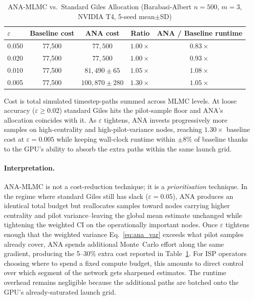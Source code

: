 \documentclass[pdflatex,sn-mathphys-num]{sn-jnl}
\theoremstyle{thmstyleone}%
\theoremstyle{thmstyletwo}%
\theoremstyle{thmstylethree}%
\begin{document}
\begin{table}[!t]
\caption{ANA-MLMC vs.\ Standard Giles Allocation (Barabasi-Albert $n=500$,
         $m=3$, NVIDIA T4, 5-seed mean$\pm$SD)}
\label{tab:ana_mlmc}
\centering
\begin{tabular}{@{}l c c c c@{}}
\toprule
$\varepsilon$ & Baseline cost & ANA cost & Ratio & ANA / Baseline runtime \\
\midrule
0.050 & 77{,}500 & $77{,}500$         & $1.00\times$ & $0.83\times$ \\
0.020 & 77{,}500 & $77{,}500$         & $1.00\times$ & $0.93\times$ \\
0.010 & 77{,}500 & $81{,}490\!\pm\!65$  & $1.05\times$ & $1.08\times$ \\
0.005 & 77{,}500 & $100{,}870\!\pm\!280$& $1.30\times$ & $1.05\times$ \\
\bottomrule
\end{tabular}
\vspace{2pt}\footnotesize Cost is total simulated timestep-paths summed across MLMC levels.
At loose accuracy ($\varepsilon\!\ge\!0.02$) standard Giles hits the pilot-sample floor and
ANA's allocation coincides with it. As $\varepsilon$ tightens, ANA invests progressively more
samples on high-centrality and high-pilot-variance nodes, reaching $1.30\times$ baseline cost at
$\varepsilon=0.005$ while keeping wall-clock runtime within $\pm 8\%$ of baseline thanks to the
GPU's ability to absorb the extra paths within the same launch grid.\normalsize
\end{table}

\paragraph{Interpretation.}
ANA-MLMC is not a cost-reduction technique; it is a \emph{prioritisation} technique. In the
regime where standard Giles still has slack ($\varepsilon=0.05$), ANA produces an identical total
budget but reallocates samples toward nodes carrying higher centrality and pilot variance--leaving
the global mean estimate unchanged while tightening the weighted CI on the operationally important
nodes. Once $\varepsilon$ tightens enough that the weighted variance Eq.~\eqref{eq:ana_var}
exceeds what pilot samples already cover, ANA spends additional Monte~Carlo effort along the same
gradient, producing the 5--30\% extra cost reported in Table~\ref{tab:ana_mlmc}. For ISP
operators choosing where to spend a fixed compute budget, this amounts to direct control over
which segment of the network gets sharpened estimates. The runtime overhead remains negligible
because the additional paths are batched onto the GPU's already-saturated launch grid.
\end{document}
